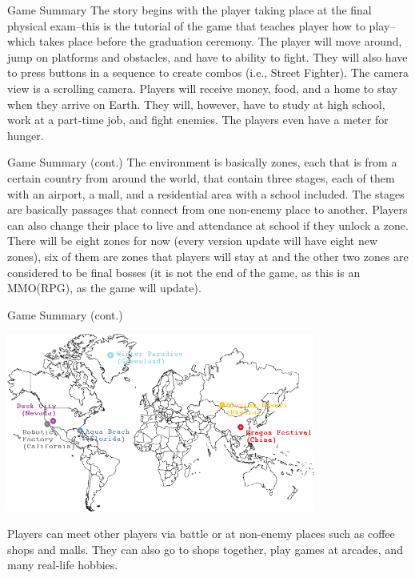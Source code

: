 \documentclass[12pt]{beamer}
\begin{document}
\begin{frame}{Game Summary}
	The story begins with the player taking place at the final physical exam--this is the tutorial of the game that teaches player how to play--which takes place before the graduation ceremony. The player will move around, jump on platforms and obstacles, and have to ability to fight. They will also have to press buttons in a sequence to create combos (i.e., Street Fighter). The camera view is a scrolling camera. Players will receive money, food, and a home to stay when they arrive on Earth. They will, however, have to study at high school, work at a part-time job, and fight enemies. The players even have a meter for hunger.
\end{frame}

\begin{frame}{Game Summary (cont.)}
	The environment is basically zones, each that is from a certain country from around the world, that contain three stages, each of them with an airport, a mall, and a residential area with a school included. The stages are basically passages that connect from one non-enemy place to another. Players can also change their place to live and attendance at school if they unlock a zone. There will be eight zones for now (every version update will have eight new zones), six of them are zones that players will stay at and the other two zones are considered to be final bosses (it is not the end of the game, as this is an MMO(RPG), as the game will update).
\end{frame}

\begin{frame}{Game Summary (cont.)}
	\begin{center}
		\includegraphics[width=4in]{WorldMapV1}
	\end{center}
	Players can meet other players via battle or at non-enemy places such as coffee shops and malls. They can also go to shops together, play games at arcades, and many real-life hobbies.
\end{frame}
\end{document}
